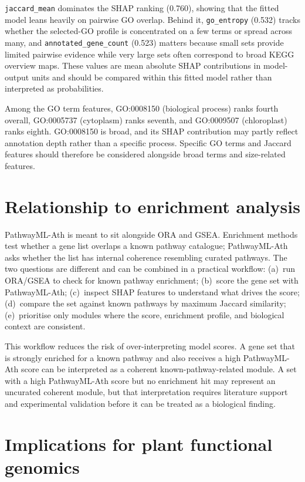\documentclass[12pt,letterpaper,oneside,openany]{book}
\begin{document}
\texttt{jaccard\_mean} dominates the SHAP ranking (0.760), showing that the fitted model leans heavily on pairwise GO overlap. Behind it, \texttt{go\_entropy} (0.532) tracks whether the selected-GO profile is concentrated on a few terms or spread across many, and \texttt{annotated\_gene\_count} (0.523) matters because small sets provide limited pairwise evidence while very large sets often correspond to broad KEGG overview maps. These values are mean absolute SHAP contributions in model-output units and should be compared within this fitted model rather than interpreted as probabilities.

Among the GO term features, GO:0008150 (biological process) ranks fourth overall, GO:0005737 (cytoplasm) ranks seventh, and GO:0009507 (chloroplast) ranks eighth. GO:0008150 is broad, and its SHAP contribution may partly reflect annotation depth rather than a specific process. Specific GO terms and Jaccard features should therefore be considered alongside broad terms and size-related features.

\section{Relationship to enrichment analysis}
\label{sec:disc_practical_workflow}

PathwayML-Ath is meant to sit alongside ORA and GSEA. Enrichment methods test whether a gene list overlaps a known pathway catalogue; PathwayML-Ath asks whether the list has internal coherence resembling curated pathways. The two questions are different and can be combined in a practical workflow: (a)~run ORA/GSEA to check for known pathway enrichment; (b)~score the gene set with PathwayML-Ath; (c)~inspect SHAP features to understand what drives the score; (d)~compare the set against known pathways by maximum Jaccard similarity; (e)~prioritise only modules where the score, enrichment profile, and biological context are consistent.

This workflow reduces the risk of over-interpreting model scores. A gene set that is strongly enriched for a known pathway and also receives a high PathwayML-Ath score can be interpreted as a coherent known-pathway-related module. A set with a high PathwayML-Ath score but no enrichment hit may represent an uncurated coherent module, but that interpretation requires literature support and experimental validation before it can be treated as a biological finding.

\section{Implications for plant functional genomics}
\label{sec:disc_plant_implications}
\end{document}
